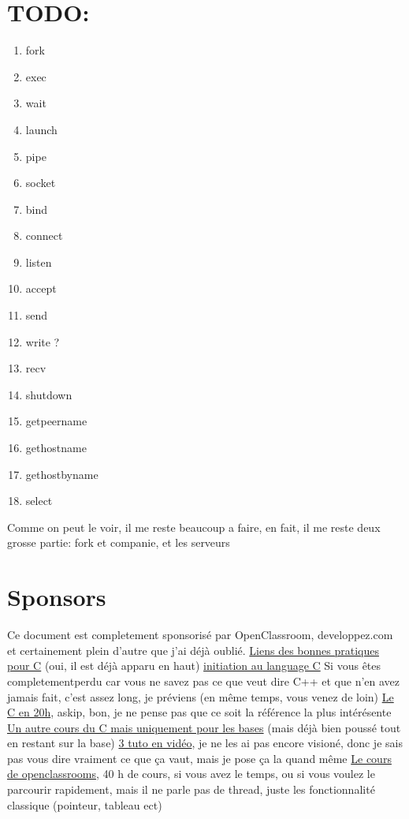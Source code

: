 \documentclass[a4paper]{article}
\begin{document}
\section{TODO:}
\begin{enumerate}
  \item fork
  \item exec
  \item wait
  \item launch
  \item pipe
  \item socket
  \item bind
  \item connect
  \item listen
  \item accept
  \item send
  \item write ?
  \item recv
  \item shutdown
  \item getpeername
  \item gethostname
  \item gethostbyname
  \item select
\end{enumerate}
Comme on peut le voir, il me reste beaucoup a faire, en fait, il me reste deux grosse partie: fork et companie, et les serveurs

\section{Sponsors}
Ce document est completement sponsorisé par OpenClassroom, developpez.com et certainement plein d'autre que j'ai déjà oublié.\newline
\href{http://emmanuel-delahaye.developpez.com/tutoriels/c/bonnes-pratiques-codage-c/#LI-A}{Liens des bonnes pratiques pour C} (oui, il est déjà apparu en haut)\newline
\href{http://melem.developpez.com/tutoriels/langage-c/initiation-langage-c/}{initiation au language C} Si vous êtes completementperdu car vous ne savez pas ce que veut dire C++ et que n'en avez jamais fait, c'est assez long, je préviens (en même temps, vous venez de loin)\newline
\href{https://c.developpez.com/cours/20-heures/}{Le C en 20h}, askip, bon, je ne pense pas que ce soit la référence la plus intérésente\newline
\href{https://c.developpez.com/cours/poly-c/?page=page_1}{Un autre cours du C mais uniquement pour les bases} (mais déjà bien poussé tout en restant sur la base)\newline
\href{https://fr.tuto.com/langage-c/}{3 tuto en vidéo}, je ne les ai pas encore visioné, donc je sais pas vous dire vraiment ce que ça vaut, mais je pose ça la quand même\newline
\href{https://openclassrooms.com/courses/apprenez-a-programmer-en-c}{Le cours de openclassrooms}, 40 h de cours, si vous avez le temps, ou si vous voulez le parcourir rapidement, mais il ne parle pas de thread, juste les fonctionnalité classique (pointeur, tableau ect)
\end{document}
